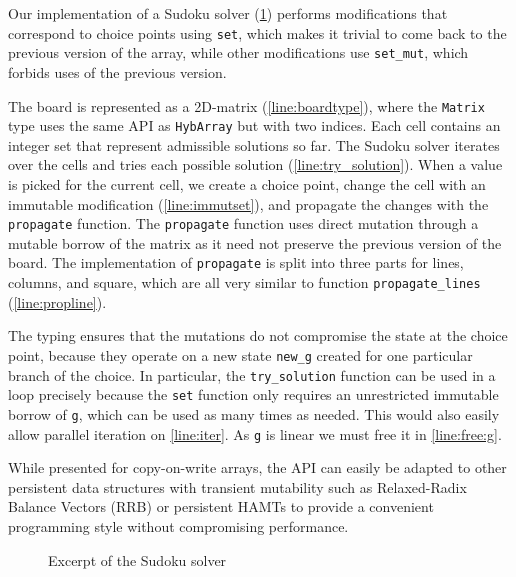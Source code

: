 Our implementation of a Sudoku solver (\cref{ex:sudoku}) performs
modifications that correspond to choice points using \lstinline/set/,
which makes it trivial to come back to the previous version
of the array, while other modifications use \lstinline/set_mut/, which
forbids uses of the previous version.

The board is represented as a 2D-matrix (\cref{line:boardtype}), where
the \lstinline/Matrix/ type uses the same API as \lstinline/HybArray/
but with two indices. 
Each cell contains an integer set that represent admissible solutions so far.
The Sudoku solver iterates over the cells and tries each possible solution (\cref{line:try_solution}).
When a value is picked for the current cell, we create a choice point,
change the cell with an immutable modification (\cref{line:immutset}), and propagate
the changes with the \lstinline/propagate/ function.
The \lstinline/propagate/ function uses direct mutation through a
mutable borrow of the matrix as it need not preserve the previous
version of the board.  
The implementation of \lstinline/propagate/ is split into three parts
for lines, columns, and square, which are all very similar to function
\lstinline/propagate_lines/ (\cref{line:propline}). 

The typing ensures that the mutations do not compromise the state at
the choice point, because they operate on a new state \lstinline/new_g/ created for one
particular branch of the choice.
In particular, the \lstinline/try_solution/ function can be used in a loop
precisely because the \lstinline/set/ function only requires an
unrestricted immutable borrow of \lstinline/g/, which can be used as
many times as needed.
This would also easily allow parallel iteration on \cref{line:iter}.
As \lstinline/g/ is linear we must free it in \cref{line:free:g}.


While presented for copy-on-write arrays, the API
can easily be adapted to other persistent data structures with
transient mutability such as Relaxed-Radix Balance Vectors (RRB) \cite{DBLP:journals/pacmpl/Puente17}
or persistent HAMTs \cite{bagwell2001ideal,clojurehamt} to provide  a
convenient programming style without compromising performance.

\begin{figure}
  \centering
  \begin{minipage}[t]{0.45\linewidth}
    
  \end{minipage}\hfill
  \begin{minipage}[t]{0.54\linewidth}
    
  \end{minipage}
  \caption{Excerpt of the Sudoku solver}
  \label{ex:sudoku}
\end{figure}

